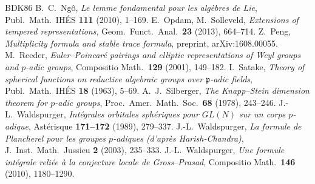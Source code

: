 \documentclass[12pt,letterpaper]{article}
\numberwithin{equation}{section}
\theoremstyle{plain}
\theoremstyle{definition}
\theoremstyle{remark}
\begin{document}
\begin{thebibliography}{BDK86}
 B.~C.~Ng\^o, \emph{Le lemme fondamental pour les alg\`ebres de Lie}, Publ.\ Math.\ IH\'ES \textbf{111} (2010), 1--169.
 E.~Opdam, M.~Solleveld, \emph{Extensions of tempered representations}, Geom.\ Funct.\ Anal.\ \textbf{23} (2013), 664--714.
 Z.~Peng, \emph{Multiplicity formula and stable trace formula}, preprint, arXiv:1608.00055.
 M.~Reeder, \emph{Euler--Poincar\'e pairings and elliptic representations of Weyl groups and $p$-adic groups}, Compositio Math.\ \textbf{129} (2001), 149--182.
 I.~Satake, \emph{Theory of spherical functions on reductive algebraic groups over $\mathfrak p$-adic fields}, Publ.\ Math.\ IH\'ES \textbf{18} (1963), 5--69.
 A.~J.~Silberger, \emph{The Knapp--Stein dimension theorem for $p$-adic groups}, Proc.\ Amer.\ Math.\ Soc.\ \textbf{68} (1978), 243--246.
 J.-L.~Waldspurger, \emph{Int\'egrales orbitales sph\'eriques pour $GL(N)$ sur un corps $p$-adique}, Ast\'erisque \textbf{171--172} (1989), 279--337.
 J.-L.~Waldspurger, \emph{La formule de Plancherel pour les groupes $p$-adiques (d'apr\`es Harish-Chandra)}, J.\ Inst.\ Math.\ Jussieu \textbf{2} (2003), 235--333.
 J.-L.~Waldspurger, \emph{Une formule int\'egrale reli\'ee \`a la conjecture locale de Gross--Prasad}, Compositio Math.\ \textbf{146} (2010), 1180--1290.
\end{thebibliography}
\end{document}
